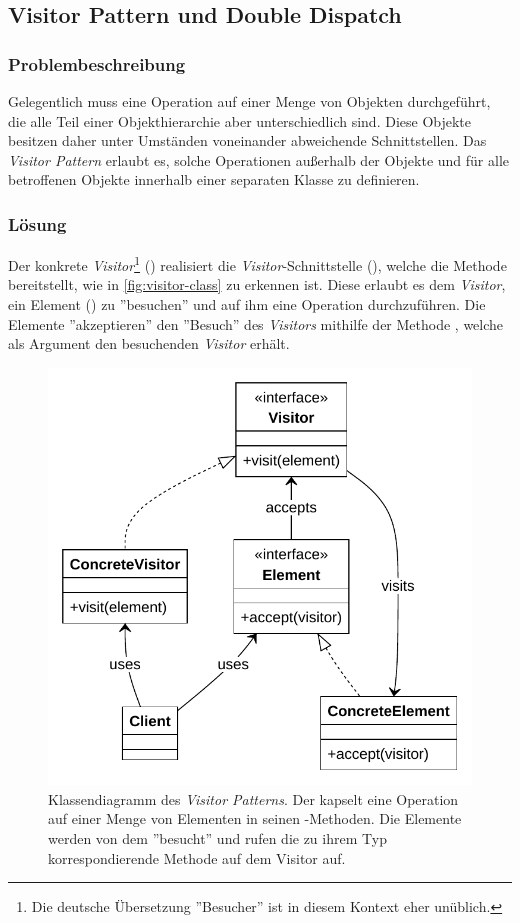\subsection{Visitor Pattern und Double Dispatch}


\subsubsection*{Problembeschreibung}

Gelegentlich muss eine Operation auf einer Menge von Objekten durchgeführt, die alle Teil einer Objekthierarchie aber unterschiedlich sind. Diese Objekte besitzen daher unter Umständen voneinander abweichende Schnittstellen. Das \emph{Visitor Pattern} erlaubt es, solche Operationen außerhalb der Objekte und für alle betroffenen Objekte innerhalb einer separaten Klasse zu definieren. \cite{gamma_design_1995}

\subsubsection*{Lösung}

Der konkrete \emph{Visitor}\footnote{Die deutsche Übersetzung ''Besucher'' ist in diesem Kontext eher unüblich.} () realisiert die \emph{Visitor}-Schnittstelle (), welche die Methode  bereitstellt, wie in \autoref{fig:visitor-class} zu erkennen ist. Diese erlaubt es dem \emph{Visitor}, ein Element () zu ''besuchen'' und auf ihm eine Operation durchzuführen. Die Elemente ''akzeptieren'' den ''Besuch'' des \emph{Visitors} mithilfe der Methode , welche als Argument den besuchenden \emph{Visitor} erhält.

\begin{figure}[!ht]
	\centering
	\includegraphics[width=0.75\linewidth]{images/patterns/visitor-class.pdf}
	\caption{Klassendiagramm des \emph{Visitor Patterns}. Der  kapselt eine Operation auf einer Menge von Elementen in seinen -Methoden. Die Elemente werden von dem  ''besucht'' und rufen die zu ihrem Typ korrespondierende Methode auf dem Visitor auf. \cite{skobeleva_visitor_2023}}
	\label{fig:visitor-class}
\end{figure}

